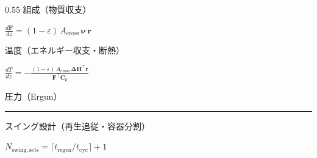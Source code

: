 \begin{frame}[t]

  \vspace{0.3em}

  \begin{columns}[T,onlytextwidth]
    \begin{column}{0.55\textwidth}
      {\footnotesize 組成（物質収支）}\par
      {\centering$\displaystyle\frac{d\boldsymbol{F}}{dz}=(1-\varepsilon)\,A_{\mathrm{cross}}\,\boldsymbol{\nu}\,\boldsymbol{r}$\par}
      \vspace{0.6em}
      {\footnotesize 温度（エネルギー収支・断熱）}\par
      {\centering$\displaystyle\frac{dT}{dz}=-\frac{(1-\varepsilon)\,A_{\mathrm{cross}}\,\boldsymbol{\Delta H}^{\!\top}\boldsymbol{r}}{\boldsymbol{F}^{\!\top}\boldsymbol{C}_p}$\par}
      \vspace{0.6em}
      {\footnotesize 圧力（Ergun）}\par
      {\centering{}\par}
      \vspace{0.8em}
      {\color{black!25}\rule{\linewidth}{0.4pt}}\par
      \vspace{0.35em}
      {\footnotesize スイング設計（再生追従・容器分割）}\par
      \vspace{0.55em}
      {\centering\footnotesize
       $\displaystyle N_{\mathrm{swing,sets}}=\big\lceil t_{\mathrm{regen}}/t_{\mathrm{cyc}}\big\rceil+1$\par
}
\end{column}
\end{columns}
\end{frame}
